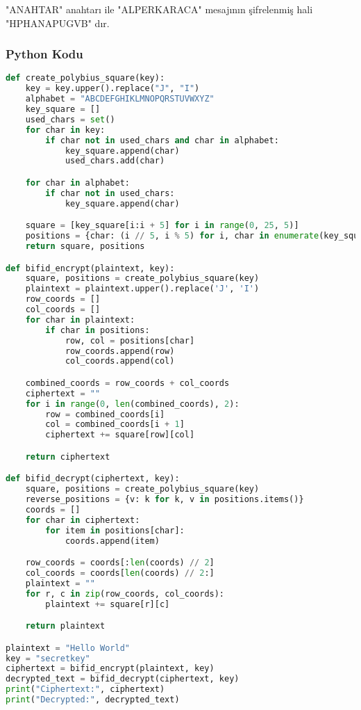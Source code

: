 "ANAHTAR" anahtarı ile "ALPERKARACA" mesajının şifrelenmiş hali "HPHANAPUGVB" dır.

\subsubsection{Python Kodu}

\begin{lstlisting}[language=Python]
def create_polybius_square(key):
    key = key.upper().replace("J", "I")
    alphabet = "ABCDEFGHIKLMNOPQRSTUVWXYZ"
    key_square = []
    used_chars = set()
    for char in key:
        if char not in used_chars and char in alphabet:
            key_square.append(char)
            used_chars.add(char)

    for char in alphabet:
        if char not in used_chars:
            key_square.append(char)

    square = [key_square[i:i + 5] for i in range(0, 25, 5)]
    positions = {char: (i // 5, i % 5) for i, char in enumerate(key_square)}
    return square, positions

def bifid_encrypt(plaintext, key):
    square, positions = create_polybius_square(key)
    plaintext = plaintext.upper().replace('J', 'I')
    row_coords = []
    col_coords = []
    for char in plaintext:
        if char in positions:
            row, col = positions[char]
            row_coords.append(row)
            col_coords.append(col)

    combined_coords = row_coords + col_coords
    ciphertext = ""
    for i in range(0, len(combined_coords), 2):
        row = combined_coords[i]
        col = combined_coords[i + 1]
        ciphertext += square[row][col]

    return ciphertext

def bifid_decrypt(ciphertext, key):
    square, positions = create_polybius_square(key)
    reverse_positions = {v: k for k, v in positions.items()}
    coords = []
    for char in ciphertext:
        for item in positions[char]:
            coords.append(item)

    row_coords = coords[:len(coords) // 2]
    col_coords = coords[len(coords) // 2:]
    plaintext = ""
    for r, c in zip(row_coords, col_coords):
        plaintext += square[r][c]

    return plaintext

plaintext = "Hello World"
key = "secretkey"
ciphertext = bifid_encrypt(plaintext, key)
decrypted_text = bifid_decrypt(ciphertext, key)
print("Ciphertext:", ciphertext)
print("Decrypted:", decrypted_text)
\end{lstlisting}

